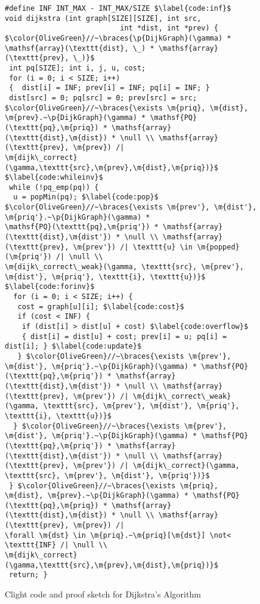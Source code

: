 
\begin{figure}[t]

\begin{lstlisting}[mathescape=true,showlines=true]
#define INF INT_MAX - INT_MAX/SIZE $\label{code:inf}$
void dijkstra (int graph[SIZE][SIZE], int src,
                           int *dist, int *prev) {
$\color{OliveGreen}//~\braces{\p{DijkGraph}(\gamma) *
\mathsf{array}(\texttt{dist}, \_) * \mathsf{array}(\texttt{prev}, \_)}$
 int pq[SIZE]; int i, j, u, cost;
 for (i = 0; i < SIZE; i++)
 {  dist[i] = INF; prev[i] = INF; pq[i] = INF; }
 dist[src] = 0; pq[src] = 0; prev[src] = src;
$\color{OliveGreen}//~\braces{\exists \m{priq}, \m{dist}, \m{prev}.~\p{DijkGraph}(\gamma) * \mathsf{PQ}(\texttt{pq},\m{priq}) * \mathsf{array}(\texttt{dist},\m{dist}) * \null \\ \mathsf{array}(\texttt{prev}, \m{prev}) /|
\m{dijk\_correct}(\gamma,\texttt{src},\m{prev},\m{dist},\m{priq})}$ $\label{code:whileinv}$
 while (!pq_emp(pq)) {
  u = popMin(pq); $\label{code:pop}$
$\color{OliveGreen}//~\braces{\exists \m{prev'}, \m{dist'}, \m{priq'}.~\p{DijkGraph}(\gamma) *
\mathsf{PQ}(\texttt{pq},\m{priq'}) * \mathsf{array}(\texttt{dist},\m{dist'}) * \null \\ \mathsf{array}(\texttt{prev}, \m{prev'}) /| \texttt{u} \in \m{popped}(\m{priq'}) /| \null \\
\m{dijk\_correct\_weak}(\gamma, \texttt{src}, \m{prev'}, \m{dist'}, \m{priq'}, \texttt{i}, \texttt{u})}$ $\label{code:forinv}$
  for (i = 0; i < SIZE; i++) {
   cost = graph[u][i]; $\label{code:cost}$
   if (cost < INF) {
    if (dist[i] > dist[u] + cost) $\label{code:overflow}$
    { dist[i] = dist[u] + cost; prev[i] = u; pq[i] = dist[i]; } $\label{code:update}$
   } $\color{OliveGreen}//~\braces{\exists \m{prev'}, \m{dist'}, \m{priq'}.~\p{DijkGraph}(\gamma) * \mathsf{PQ}(\texttt{pq},\m{priq'}) * \mathsf{array}(\texttt{dist},\m{dist'}) * \null \\ \mathsf{array}(\texttt{prev}, \m{prev'}) /| \m{dijk\_correct\_weak}(\gamma, \texttt{src}, \m{prev'}, \m{dist'}, \m{priq'}, \texttt{i}, \texttt{u})}$
  } $\color{OliveGreen}//~\braces{\exists \m{prev'}, \m{dist'}, \m{priq'}.~\p{DijkGraph}(\gamma) * \mathsf{PQ}(\texttt{pq},\m{priq'}) * \mathsf{array}(\texttt{dist},\m{dist'}) * \null \\ \mathsf{array}(\texttt{prev}, \m{prev'}) /| \m{dijk\_correct}(\gamma, \texttt{src}, \m{prev'}, \m{dist'}, \m{priq'})}$
 } $\color{OliveGreen}//~\braces{\exists \m{priq}, \m{dist}, \m{prev}.~\p{DijkGraph}(\gamma) * \mathsf{PQ}(\texttt{pq},\m{priq}) * \mathsf{array}(\texttt{dist},\m{dist}) * \null \\ \mathsf{array}(\texttt{prev}, \m{prev}) /|
\forall \m{dst} \in \m{priq}.~\m{priq}[\m{dst}] \not< \texttt{INF} /| \null \\
\m{dijk\_correct}(\gamma,\texttt{src},\m{prev},\m{dist},\m{priq})}$
 return; }
\end{lstlisting}
\vspace{-1em}
\caption{Clight code and proof sketch for Dijkstra's Algorithm}
\vspace{-1em}
\label{fig:decorated}
\end{figure} 